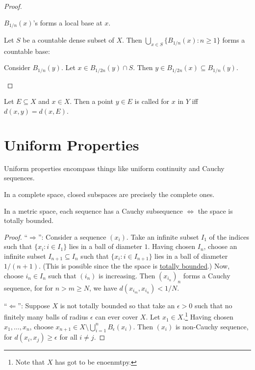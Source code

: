	\begin{proof}
		\begin{mylist}
			\item $B_{1/n}(x)$'s forms a local base at $x$.
			
			\item Let $S$ be a countable dense subset of $X$. Then $\bigcup_{x\in S}\{ B_{1/n}(x) : n\ge 1 \}$ forms a countable base:
			\begin{subproof}
				Consider $B_{1/n}(y)$. Let $x\in B_{1/2n}(y)\cap S$. Then $y\in B_{1/2n}(x)\subseteq B_{1/n}(y)$.\qedhere
			\end{subproof}
		\end{mylist}
	\end{proof}

	Let $E\subseteq X$ and $x\in X$. Then a point $y\in E$ is called  for $x$ in $Y$ iff $d(x, y) = d(x, E)$.
	
	

\section{Uniform Properties}

Uniform properties encompass things like uniform continuity and Cauchy sequences.



\begin{lem}\label{LEM: closed subsets in complete spaces}
	In a complete space, closed subspaces are precisely the complete ones.
\end{lem}


\begin{lem}
	In a metric space, each sequence has a Cauchy subsequence $\iff$ the space is totally bounded.
\end{lem}

\begin{proof}
	``$\Rightarrow$'': Consider a sequence $(x_i)$. Take an infinite subset $I_1$ of the indices such that $\{x_i : i\in I_1\}$ lies in a ball of diameter $1$. Having chosen $I_n$, choose
	an infinite subset $I_{n + 1}\subseteq I_n$ such that $\{x_i : i\in I_{n + 1}\}$ lies in a ball of diameter $1/(n + 1)$. (This is possible since the the space is \ul{totally bounded}.) Now, choose $i_n\in I_n$ such that $(i_n)$ is increasing. Then $(x_{i_n})_n$ forms a Cauchy sequence, for for $n > m\ge N$, we have $d(x_{i_m}, x_{i_n}) < 1/N$.
	
	``$\Leftarrow$'': Suppose $X$ is not totally bounded so that take an $\epsilon > 0$ such that no finitely many balls of radius $\epsilon$ can ever cover $X$. Let $x_1\in X$.\footnote{
		Note that $X$ has got to be enoenmtpy.}
	Having chosen $x_1, \ldots, x_n$, choose
	$x_{n + 1}\in X\setminus\bigcup_{i = 1}^n B_\epsilon(x_i)$. Then $(x_i)$ is non-Cauchy sequence, for $d(x_i, x_j)\ge \epsilon$ for all $i\ne j$.
\end{proof}

